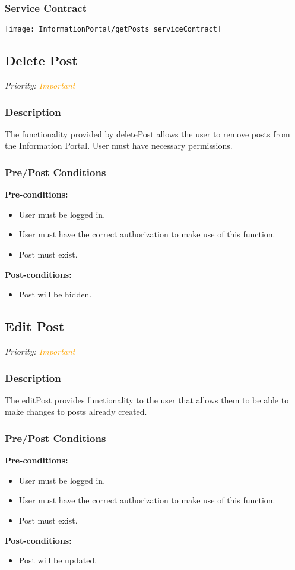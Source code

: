 \subsubsection{Service Contract}
\texttt{[image: InformationPortal/getPosts\_serviceContract]}

\subsection{Delete Post}
\textit{Priority: \textcolor{orange}{Important}}

\subsubsection{Description}
The functionality provided by deletePost allows the user to remove posts from the Information Portal. User must have necessary permissions.



\subsubsection{Pre/Post Conditions}
	\textbf{Pre-conditions:}
	\begin{itemize}
		\item User must be logged in.
		\item User must have the correct authorization to make use of this function.
		\item Post must exist.
	\end{itemize}
	\textbf{Post-conditions:}
	\begin{itemize}
		\item Post will be hidden.
	\end{itemize}

\subsection{Edit Post}
\textit{Priority: \textcolor{orange}{Important}}

\subsubsection{Description}
The editPost provides functionality to the user that allows them to be able to make changes to posts already created.



\subsubsection{Pre/Post Conditions}
	\textbf{Pre-conditions:}
	\begin{itemize}
		\item User must be logged in.
		\item User must have the correct authorization to make use of this function.
		\item Post must exist.
	\end{itemize}
	\textbf{Post-conditions:}
	\begin{itemize}
		\item Post will be updated.
	\end{itemize}